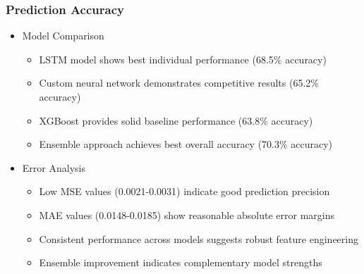 \documentclass[conference]{IEEEtran}
\begin{document}
\subsubsection{Prediction Accuracy}
\begin{itemize}
    \item Model Comparison
    \begin{itemize}
        \item LSTM model shows best individual performance (68.5\% accuracy)
        \item Custom neural network demonstrates competitive results (65.2\% accuracy)
        \item XGBoost provides solid baseline performance (63.8\% accuracy)
        \item Ensemble approach achieves best overall accuracy (70.3\% accuracy)
    \end{itemize}
    
    \item Error Analysis
    \begin{itemize}
        \item Low MSE values (0.0021-0.0031) indicate good prediction precision
        \item MAE values (0.0148-0.0185) show reasonable absolute error margins
        \item Consistent performance across models suggests robust feature engineering
        \item Ensemble improvement indicates complementary model strengths
    \end{itemize}
\end{itemize}
\end{document}

